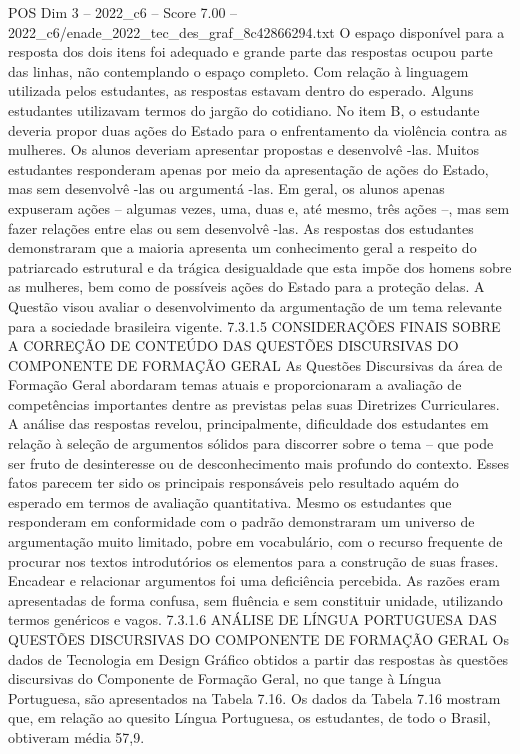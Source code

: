 \begin{textsample}{POS Dim 3 – 2022\_c6 – Score 7.00 – 2022\_c6/enade\_2022\_tec\_des\_graf\_8c42866294.txt}
O espaço disponível para a resposta dos dois itens foi adequado e grande parte das respostas ocupou parte das linhas, não contemplando o espaço completo.
Com relação à linguagem utilizada pelos estudantes, as respostas estavam dentro do esperado.
Alguns estudantes utilizavam termos do jargão do cotidiano.
No item B, o estudante deveria propor duas ações do Estado para o enfrentamento da violência contra as mulheres.
Os alunos deveriam apresentar propostas e desenvolvê -las.
Muitos estudantes responderam apenas por meio da apresentação de ações do Estado, mas sem desenvolvê -las ou argumentá -las.
Em geral, os alunos apenas expuseram ações – algumas vezes, uma, duas e, até mesmo, três ações –, mas sem fazer relações entre elas ou sem desenvolvê -las.
As respostas dos estudantes demonstraram que a maioria apresenta um conhecimento geral a respeito do patriarcado estrutural e da trágica desigualdade que esta impõe dos homens sobre as mulheres, bem como de possíveis ações do Estado para a proteção delas.
A Questão visou avaliar o desenvolvimento da argumentação de um tema relevante para a sociedade brasileira vigente. 7.3.1.5 CONSIDERAÇÕES FINAIS SOBRE A CORREÇÃO DE CONTEÚDO DAS QUESTÕES DISCURSIVAS DO COMPONENTE DE FORMAÇÃO GERAL As Questões Discursivas da área de Formação Geral abordaram temas atuais e proporcionaram a avaliação de competências importantes dentre as previstas pelas suas Diretrizes Curriculares.
A análise das respostas revelou, principalmente, dificuldade dos estudantes em relação à seleção de argumentos sólidos para discorrer sobre o tema – que pode ser fruto de desinteresse ou de desconhecimento mais profundo do contexto.
Esses fatos parecem ter sido os principais responsáveis pelo resultado aquém do esperado em termos de avaliação quantitativa.
Mesmo os estudantes que responderam em conformidade com o padrão demonstraram um universo de argumentação muito limitado, pobre em vocabulário, com o recurso frequente de procurar nos textos introdutórios os elementos para a construção de suas frases.
Encadear e relacionar argumentos foi uma deficiência percebida.
As razões eram apresentadas de forma confusa, sem fluência e sem constituir unidade, utilizando termos genéricos e vagos. 7.3.1.6 ANÁLISE DE LÍNGUA PORTUGUESA DAS QUESTÕES DISCURSIVAS DO COMPONENTE DE FORMAÇÃO GERAL Os dados de Tecnologia em Design Gráfico obtidos a partir das respostas às questões discursivas do Componente de Formação Geral, no que tange à Língua Portuguesa, são apresentados na Tabela 7.16.
Os dados da Tabela 7.16 mostram que, em relação ao quesito Língua Portuguesa, os estudantes, de todo o Brasil, obtiveram média 57,9.

\end{textsample}
